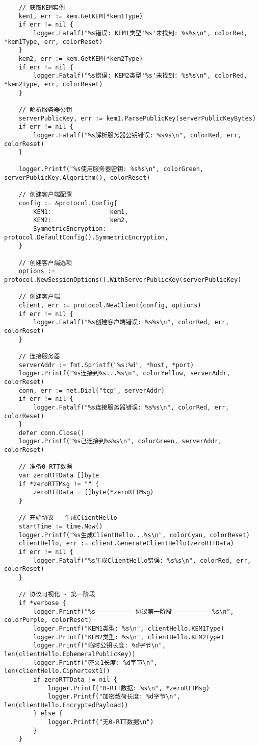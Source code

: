 \begin{verbatim}
    // 获取KEM实例
    kem1, err := kem.GetKEM(*kem1Type)
    if err != nil {
        logger.Fatalf("%s错误: KEM1类型'%s'未找到: %s%s\n", colorRed, *kem1Type, err, colorReset)
    }
    kem2, err := kem.GetKEM(*kem2Type)
    if err != nil {
        logger.Fatalf("%s错误: KEM2类型'%s'未找到: %s%s\n", colorRed, *kem2Type, err, colorReset)
    }

    // 解析服务器公钥
    serverPublicKey, err := kem1.ParsePublicKey(serverPublicKeyBytes)
    if err != nil {
        logger.Fatalf("%s解析服务器公钥错误: %s%s\n", colorRed, err, colorReset)
    }

    logger.Printf("%s使用服务器密钥: %s%s\n", colorGreen, serverPublicKey.Algorithm(), colorReset)

    // 创建客户端配置
    config := &protocol.Config{
        KEM1:                kem1,
        KEM2:                kem2,
        SymmetricEncryption: protocol.DefaultConfig().SymmetricEncryption,
    }

    // 创建客户端选项
    options := protocol.NewSessionOptions().WithServerPublicKey(serverPublicKey)

    // 创建客户端
    client, err := protocol.NewClient(config, options)
    if err != nil {
        logger.Fatalf("%s创建客户端错误: %s%s\n", colorRed, err, colorReset)
    }

    // 连接服务器
    serverAddr := fmt.Sprintf("%s:%d", *host, *port)
    logger.Printf("%s连接到%s...%s\n", colorYellow, serverAddr, colorReset)
    conn, err := net.Dial("tcp", serverAddr)
    if err != nil {
        logger.Fatalf("%s连接服务器错误: %s%s\n", colorRed, err, colorReset)
    }
    defer conn.Close()
    logger.Printf("%s已连接到%s%s\n", colorGreen, serverAddr, colorReset)

    // 准备0-RTT数据
    var zeroRTTData []byte
    if *zeroRTTMsg != "" {
        zeroRTTData = []byte(*zeroRTTMsg)
    }

    // 开始协议 - 生成ClientHello
    startTime := time.Now()
    logger.Printf("%s生成ClientHello...%s\n", colorCyan, colorReset)
    clientHello, err := client.GenerateClientHello(zeroRTTData)
    if err != nil {
        logger.Fatalf("%s生成ClientHello错误: %s%s\n", colorRed, err, colorReset)
    }

    // 协议可视化 - 第一阶段
    if *verbose {
        logger.Printf("%s---------- 协议第一阶段 ----------%s\n", colorPurple, colorReset)
        logger.Printf("KEM1类型: %s\n", clientHello.KEM1Type)
        logger.Printf("KEM2类型: %s\n", clientHello.KEM2Type)
        logger.Printf("临时公钥长度: %d字节\n", len(clientHello.EphemeralPublicKey))
        logger.Printf("密文1长度: %d字节\n", len(clientHello.Ciphertext1))
        if zeroRTTData != nil {
            logger.Printf("0-RTT数据: %s\n", *zeroRTTMsg)
            logger.Printf("加密载荷长度: %d字节\n", len(clientHello.EncryptedPayload))
        } else {
            logger.Printf("无0-RTT数据\n")
        }
    }


\end{verbatim}
